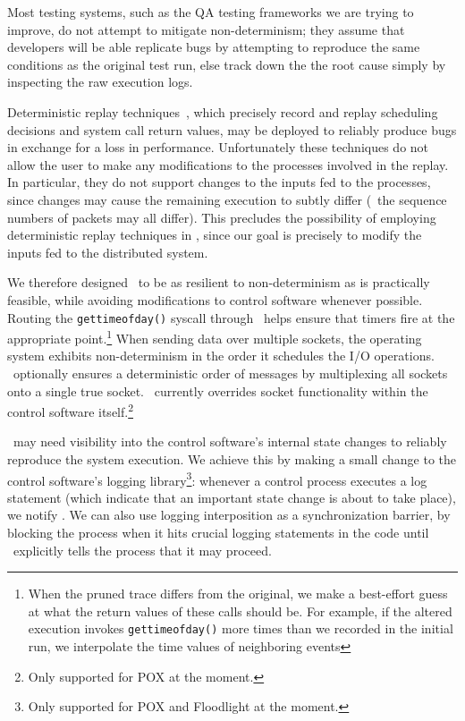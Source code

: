 Most testing systems, such as the QA testing frameworks we are
trying to improve, do not attempt to mitigate non-determinism; they assume
that developers will be able replicate bugs by attempting to reproduce the
same conditions as the original test run, else track down the the root cause simply by
inspecting the raw execution logs.

Deterministic replay techniques~\cite{Dunlap:2002:REI:844128.844148,Geels:2006:RDD:1267359.1267386},
which precisely record and replay scheduling decisions and system call return values,
may be deployed to reliably produce bugs in exchange for a loss in performance.
Unfortunately these techniques do not allow the user to make any modifications to the processes
involved in the replay. In particular, they do not support changes to the inputs fed to the
processes, since changes may cause the remaining execution to
subtly differ (\eg~the sequence numbers of packets may all differ).
This precludes the possibility of employing deterministic replay techniques in
\projectname, since our goal is precisely to modify the inputs fed to the
distributed system.

We therefore designed \projectname~to be as resilient to non-determinism as is
practically feasible, while avoiding modifications to control software whenever possible.
Routing the {\tt gettimeofday()} syscall through \projectname~helps ensure that timers fire
at the appropriate point.\footnote{When the pruned trace differs from the original, we make a
best-effort guess at what the return values of these calls should be. For example,
if the altered execution invokes {\tt gettimeofday()} more times than we recorded
in the initial run, we interpolate the time values of neighboring events}
When sending data over multiple sockets, the operating system exhibits
non-determinism in the order it schedules the I/O operations.
\projectname~optionally ensures a deterministic order of messages
by multiplexing all sockets
onto a single true socket. \projectname~currently overrides socket functionality within the control
software itself.\footnote{Only supported for POX at the moment.}

\projectname~may need visibility into the control software's internal state
changes to reliably reproduce the system execution. We achieve this by
making a
small change to the control software's logging library\footnote{Only supported
for POX and Floodlight at the moment.}: whenever a control process executes a log
statement (which indicate that an important state change is about to take
place), we notify \projectname. We can also use logging interposition as a
synchronization barrier, by blocking the process when it hits crucial logging statements in the code
until \projectname~explicitly tells the process that it may proceed.

